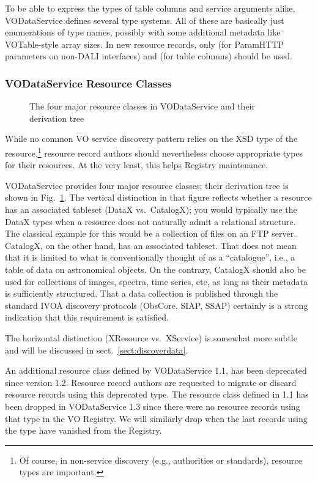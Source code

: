 \documentclass[11pt,a4paper]{ivoa}
\begin{document}
To be able to express the types of table columns and service arguments
alike, VODataService defines several type systems.  All of these are
basically just enumerations of type names, possibly with some additional
metadata like VOTable-style array sizes.  In new resource records, only
 (for ParamHTTP parameters on non-DALI
interfaces) and
 (for table columns) should be used.

\subsubsection{VODataService Resource Classes}
\label{sect:rescls}

\begin{figure}
\centerline{}
\caption{The four major resource classes in VODataService and their
derivation tree}
\label{fig:rescls}
\end{figure}

While no common VO service discovery pattern relies on the XSD type  of the
resource,\footnote{Of course, in non-service discovery (e.g., authorities
or standards), resource types are important.} resource
record authors should
nevertheless choose appropriate types for their resources.  At the
very least, this helps Registry maintenance.

VODataService provides four major resource classes; their derivation
tree is shown in Fig.~\ref{fig:rescls}.  The vertical distinction in
that figure reflects whether a resource has an associated tableset
(DataX vs.~CatalogX); you would typically use the DataX types when a
resource does not naturally admit a relational structure.  The classical
example for this would be a collection of files on an FTP server.  CatalogX,
on the other hand, has an associated tableset.  That does not mean that
it is limited to what is conventionally thought of as a ``catalogue'',
i.e., a table of data on astronomical objects.  On the
contrary, CatalogX should also be used for collections of images,
spectra, time series, etc, as long as their metadata is sufficiently
structured.  That a data collection is published through the standard
IVOA discovery protocols (ObsCore,
SIAP, SSAP) certainly is a strong indication that this requirement is
satisfied.

The horizontal distinction (XResource vs.~XService) is somewhat more
subtle and will be discussed in sect.~\ref{sect:discoverdata}.

An additional resource class defined by VODataService 1.1,
has been deprecated since version 1.2.
Resource record authors are requested to migrate or discard resource
records using this deprecated type.  The  resource
class defined in 1.1 has been
dropped in VODataService 1.3 since there were no resource records using
that type in the VO Registry. We will similarly drop
 when the last records using the type have
vanished from the Registry.
\end{document}
